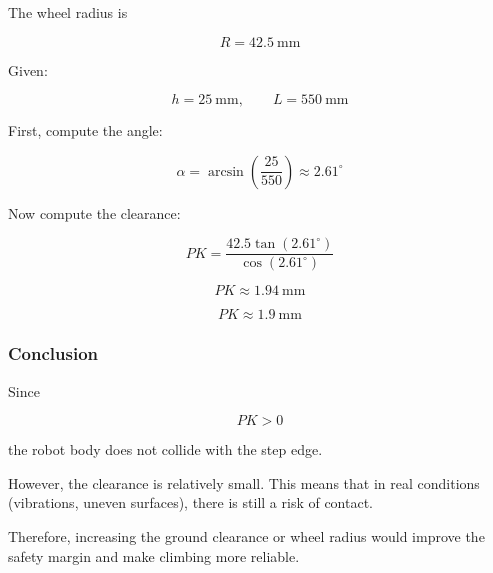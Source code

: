 \documentclass{article}
\begin{document}
The wheel radius is

\[
R = 42.5\ \text{mm}
\]

Given:

\[
h = 25\ \text{mm}, \qquad L = 550\ \text{mm}
\]

First, compute the angle:

\[
\alpha = \arcsin\left(\frac{25}{550}\right)
\approx 2.61^\circ
\]

Now compute the clearance:

\[
PK = \frac{42.5 \tan(2.61^\circ)}{\cos(2.61^\circ)}
\]

\[
PK \approx 1.94\ \text{mm}
\]

\[
\boxed{PK \approx 1.9\ \text{mm}}
\]

\subsubsection{Conclusion}
Since

\[
PK > 0
\]

the robot body does not collide with the step edge.

However, the clearance is relatively small.  
This means that in real conditions (vibrations, uneven surfaces), there is still a risk of contact.

Therefore, increasing the ground clearance or wheel radius would improve the safety margin and make climbing more reliable.
\end{document}
